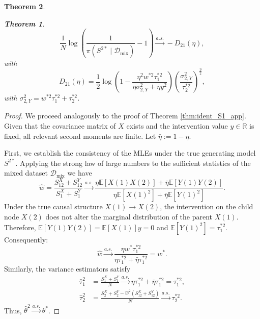 \documentclass[accepted]{uai2026} %
\newcommand{\train}{\mathcal{D}}
\newcommand{\mixdata}{\train_{\text{mix}}}
\newcommand{\tsone}{\tau_1^{*2}}
\newcommand{\tstwo}{\tau_2^{*2}}
\theoremstyle{boldremark}
\newtheorem{theorem}{Theorem}[section]
\begin{document}
\begin{theorem}
\begin{theorem}
    \[
        \frac{1}{N} \log \left( \frac{1}{\pi(S^{2*} \mid \mixdata)} - 1 \right) \xrightarrow{a.s.} -D_{21}(\eta),
    \]
    with 
    \begin{equation}
        \label{eq:D_21_def_app}
        D_{21}(\eta) = \frac{1}{2}\log \left( 1- \frac{\eta^2 w^{*2}\tau_1^{*2}}{\eta\sigma_{2, Y}^2 +\bar{\eta}y^2}\right) \left(\frac{\sigma_{2, Y}^2}{\tau_2^{*2}} \right)^ \frac{\eta}{2},
    \end{equation}
with $\sigma_{2, Y}^2 = w^{*2}\tsone+\tstwo$.
\end{theorem}
\end{theorem}

\begin{proof}
    We proceed analogously to the proof of Theorem \ref{thm:ident_S1_app}. Given that the covariance matrix of $X$ exists and the intervention value $y \in \mathbb{R}$ is fixed, all relevant second moments are finite. Let $\bar{\eta} := 1 - \eta$.
    
    First, we establish the consistency of the MLEs under the true generating model $S^{2*}$. Applying the strong law of large numbers to the sufficient statistics of the mixed dataset $\mixdata$ we have
    \begin{equation}
        \hat{w} = \frac{S_{12}^X + S_{12}^Y}{S_1^X + S_1^Y} \xrightarrow{a.s.} \frac{\eta \mathbb{E}[X(1)X(2)] + \bar{\eta}\mathbb{E}[Y(1)Y(2)]}{\eta \mathbb{E}[X(1)^2] + \bar{\eta}\mathbb{E}[Y(1)^2]}.
    \end{equation}
    Under the true causal structure $X(1) \to X(2)$, the intervention on the child node $X(2)$ does not alter the marginal distribution of the parent $X(1)$. Therefore, $\mathbb{E}[Y(1)Y(2)] = \mathbb{E}[X(1)]y = 0$ and $\mathbb{E}[Y(1)^2] = \tau_1^{*2}$. Consequently:
    \begin{equation}
        \hat{w} \xrightarrow{a.s.} \frac{\eta w^* \tau_1^{*2}}{\eta \tau_1^{*2} + \bar{\eta}\tau_1^{*2}} = w^*.
    \end{equation}
    Similarly, the variance estimators satisfy
    \begin{align*}
        \hat{\tau}_1^{2} &= \frac{S_1^X + S_1^Y}{N} \xrightarrow{a.s.} \eta \tau_1^{*2} + \bar{\eta} \tau_1^{*2} = \tau_1^{*2}, \\
        \hat{\tau}_2^{2} &= \frac{S_2^X + S_2^Y - \hat{w}^2(S_{12}^X + S_{12}^Y)}{N} \xrightarrow{a.s.} \tau_2^{*2}.
    \end{align*}
    Thus, $\hat{\theta}^2 \xrightarrow{a.s.} \theta^*$.


\end{proof}
\end{document}
